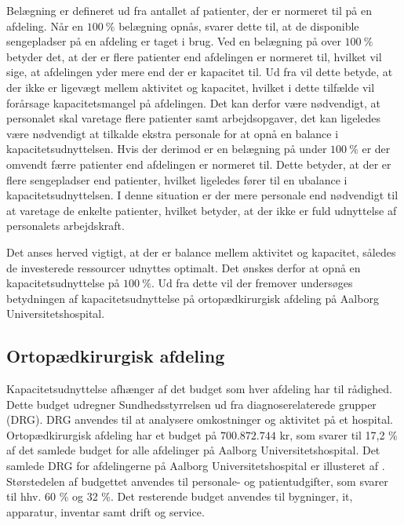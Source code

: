 Belægning er defineret ud fra antallet af patienter, der er normeret til på en afdeling\cite{Heidmann2014}. Når en $100~\%$ belægning opnås, svarer dette til, at de disponible sengepladser på en afdeling er taget i brug. Ved en belægning på over $100~\%$ betyder det, at der er flere patienter end afdelingen er normeret til, hvilket vil sige, at afdelingen yder mere end der er kapacitet til. Ud fra  vil dette betyde, at der ikke er ligevægt mellem aktivitet og kapacitet, hvilket i dette tilfælde vil forårsage kapacitetsmangel på afdelingen. Det kan derfor være nødvendigt, at personalet skal varetage flere patienter samt arbejdsopgaver, det kan ligeledes være nødvendigt at tilkalde ekstra personale for at opnå en balance i kapacitetsudnyttelsen.
Hvis der derimod er en belægning på under $100~\%$ er der omvendt færre patienter end afdelingen er normeret til. Dette betyder, at der er flere sengepladser end patienter, hvilket ligeledes fører til en ubalance i kapacitetsudnyttelsen. I denne situation er der mere personale end nødvendigt til at varetage de enkelte patienter, hvilket betyder, at der ikke er fuld udnyttelse af personalets arbejdskraft.\cite{Pauly1986} 

Det anses herved vigtigt, at der er balance mellem aktivitet og kapacitet, således de investerede ressourcer udnyttes optimalt. Det ønskes derfor at opnå en kapacitetsudnyttelse på $100~\%$. Ud fra dette vil der fremover undersøges betydningen af kapacitetsudnyttelse på ortopædkirurgisk afdeling på Aalborg Universitetshospital. 

\subsection{Ortopædkirurgisk afdeling}
Kapacitetsudnyttelse afhænger af det budget som hver afdeling har til rådighed. Dette budget udregner Sundhedsstyrrelsen ud fra diagnoserelaterede grupper (DRG). DRG anvendes til at analysere omkostninger og aktivitet på et hospital.\cite{DRG2016} Ortopædkirurgisk afdeling har et budget på $700.872.744$ kr, som svarer til 17,2 \% af det samlede budget for alle afdelinger på Aalborg Universitetshospital. Det samlede DRG for afdelingerne på Aalborg Universitetshospital er illusteret af .\cite{Rasmussen2016}
Størstedelen af budgettet anvendes til personale- og patientudgifter, som svarer til hhv. 60 \% og 32 \%. Det resterende budget anvendes til bygninger, it, apparatur, inventar samt drift og service\cite{Noegletal2016}. 


